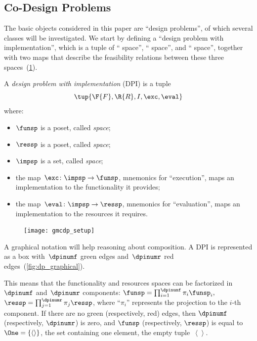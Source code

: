 \subsection{Co-Design Problems\label{sec:Design-Problems}}

The basic objects considered in this paper are ``design problems'',
of which several classes will be investigated. We start by defining
a ``design problem with implementation'', which is a tuple of ``
space'', `` space'', and ``
space'', together with two maps that describe the feasibility relations
between these three spaces~(\cref{fig:setup}).
\begin{definition}
\label{def:design_problem}A \emph{design problem with implementation}
(DPI) is a tuple
\begin{equation*}
  \tup{\F{F},\R{R},I,\exc,\eval}  
\end{equation*}
where:

\begin{itemize}
\item $\funsp$ is a poset, called \emph{ space};
\item $\ressp$ is a poset, called \emph{ space};
\item $\impsp$ is a set, called \emph{ space};
\item the map~$\exc\colon\impsp\rightarrow\funsp$, mnemonics for ``execution'',
maps an implementation to the functionality it provides;
\item the map~$\eval\colon\impsp\rightarrow\ressp$, mnemonics for ``evaluation'',
maps an implementation to the resources it requires.
\end{itemize}

\begin{figure}[h]
\begin{center}
    \texttt{[image: gmcdp\_setup]}
\end{center}
\caption{\label{fig:setup}}
\end{figure}
\end{definition}


A graphical notation will help reasoning about composition. A DPI
is represented as a box with~$\dpinumf$ green edges and~$\dpinumr$
red edges~(\cref{fig:dp_graphical}).


\noindent This means that the functionality and resources spaces
can be factorized in~$\dpinumf$ and~$\dpinumr$ components: $\funsp=\prod_{i=1}^{\dpinumf}\pi_{i}\funsp_{i},$
$\ressp=\prod_{j=1}^{\dpinumr}\pi_{j}\ressp$, where ``$\pi_{i}$''
represents the projection to the $i$-th component. If there are no
green (respectively, red) edges, then $\dpinumf$ (respectively, $\dpinumr$)
is zero, and $\funsp$ (respectively, $\ressp$) is equal to~$\One=\{\left\langle \right\rangle \}$,
the set containing one element, the empty tuple~$\left\langle \right\rangle $.

